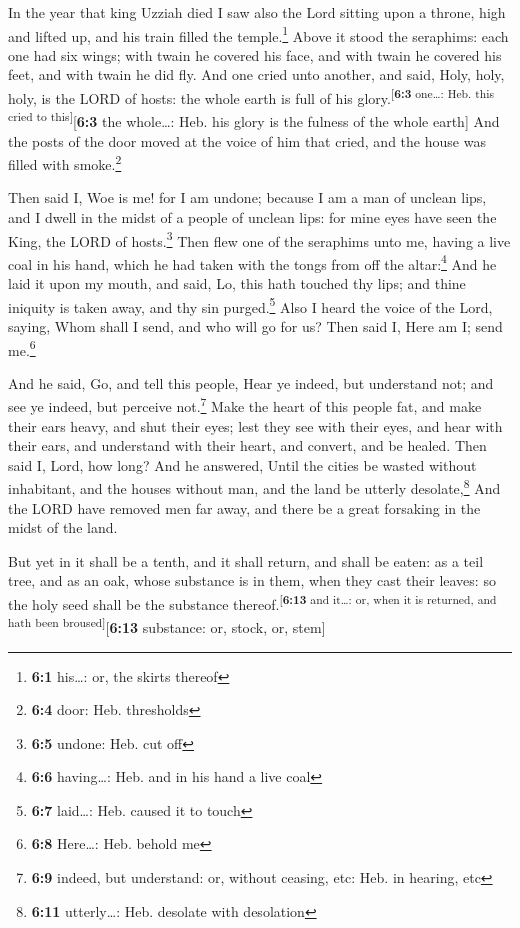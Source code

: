  In the year that king Uzziah died I saw also the Lord
sitting upon a throne, high and lifted up, and his train filled the
temple.\footnote{\textbf{6:1} his\ldots: or, the skirts thereof}
 Above it stood the seraphims: each one had six wings;
with twain he covered his face, and with twain he covered his feet, and
with twain he did fly.  And one cried unto another, and
said, Holy, holy, holy, is the LORD of hosts: the whole earth is full of
his glory.\textsuperscript{{[}\textbf{6:3} one\ldots: Heb. this cried to
this{]}}{[}\textbf{6:3} the whole\ldots: Heb. his glory is the fulness
of the whole earth{]}  And the posts of the door moved at
the voice of him that cried, and the house was filled with
smoke.\footnote{\textbf{6:4} door: Heb. thresholds}

 Then said I, Woe is me! for I am undone; because I am a
man of unclean lips, and I dwell in the midst of a people of unclean
lips: for mine eyes have seen the King, the LORD of hosts.\footnote{\textbf{6:5}
  undone: Heb. cut off}  Then flew one of the seraphims
unto me, having a live coal in his hand, which he had taken with the
tongs from off the altar:\footnote{\textbf{6:6} having\ldots: Heb. and
  in his hand a live coal}  And he laid it upon my mouth,
and said, Lo, this hath touched thy lips; and thine iniquity is taken
away, and thy sin purged.\footnote{\textbf{6:7} laid\ldots: Heb. caused
  it to touch}  Also I heard the voice of the Lord,
saying, Whom shall I send, and who will go for us? Then said I, Here am
I; send me.\footnote{\textbf{6:8} Here\ldots: Heb. behold me}

 And he said, Go, and tell this people, Hear ye indeed,
but understand not; and see ye indeed, but perceive not.\footnote{\textbf{6:9}
  indeed, but understand: or, without ceasing, etc: Heb. in hearing, etc}
 Make the heart of this people fat, and make their ears
heavy, and shut their eyes; lest they see with their eyes, and hear with
their ears, and understand with their heart, and convert, and be healed.
 Then said I, Lord, how long? And he answered, Until the
cities be wasted without inhabitant, and the houses without man, and the
land be utterly desolate,\footnote{\textbf{6:11} utterly\ldots: Heb.
  desolate with desolation}  And the LORD have removed
men far away, and there be a great forsaking in the midst of the land.

 But yet in it shall be a tenth, and it shall return, and
shall be eaten: as a teil tree, and as an oak, whose substance is in
them, when they cast their leaves: so the holy seed shall be the
substance thereof.\textsuperscript{{[}\textbf{6:13} and it\ldots: or,
when it is returned, and hath been broused{]}}{[}\textbf{6:13}
substance: or, stock, or, stem{]}

